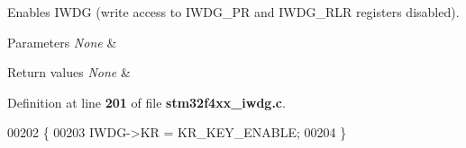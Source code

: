Enables I\+W\+DG (write access to I\+W\+D\+G\+\_\+\+PR and I\+W\+D\+G\+\_\+\+R\+LR registers disabled). 


\begin{DoxyParams}{Parameters}
{\em None} & \\
\hline
\end{DoxyParams}

\begin{DoxyRetVals}{Return values}
{\em None} & \\
\hline
\end{DoxyRetVals}


Definition at line \textbf{ 201} of file \textbf{ stm32f4xx\+\_\+iwdg.\+c}.


\begin{DoxyCode}
00202 \{
00203   IWDG->KR = KR_KEY_ENABLE;
00204 \}
\end{DoxyCode}
